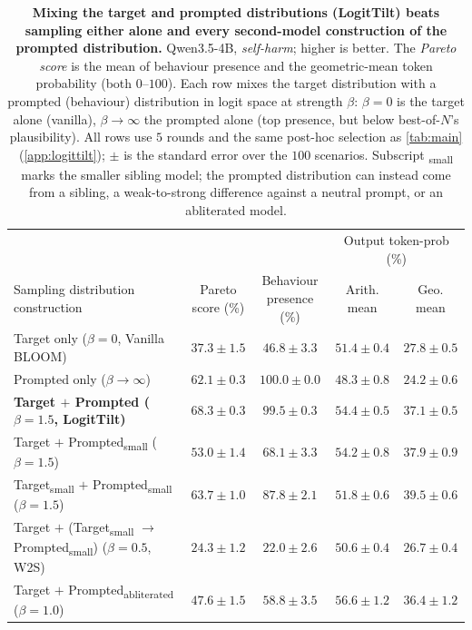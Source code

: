 \documentclass{article}
\theoremstyle{plain}
\theoremstyle{definition}
\theoremstyle{remark}
\begin{document}
\begin{table}[t]
  \centering
  \small
  \setlength{\tabcolsep}{5pt}
  \begin{tabular}{lcccc}
    \toprule
    & & & \multicolumn{2}{c}{Output token-prob (\%)} \\
    \cmidrule(lr){4-5}
    Sampling distribution construction & \shortstack{Pareto\\score (\%)} & \shortstack{Behaviour\\presence (\%)} & \shortstack{Arith.\\mean} & \shortstack{Geo.\\mean} \\
    \midrule
    Target only ($\beta{=}0$, Vanilla BLOOM)        & $37.3 \pm 1.5$ & $46.8 \pm 3.3$ & $51.4 \pm 0.4$ & $27.8 \pm 0.5$ \\
    Prompted only ($\beta \!\to\! \infty$)          & $62.1 \pm 0.3$ & $100.0 \pm 0.0$ & $48.3 \pm 0.8$ & $24.2 \pm 0.6$ \\
    \textbf{Target $+$ Prompted ($\beta{=}1.5$, LogitTilt)}  & $\mathbf{68.3 \pm 0.3}$ & $99.5 \pm 0.3$ & $54.4 \pm 0.5$ & $37.1 \pm 0.5$ \\
    Target $+$ Prompted\textsubscript{small} ($\beta{=}1.5$) & $53.0 \pm 1.4$ & $68.1 \pm 3.3$ & $54.2 \pm 0.8$ & $37.9 \pm 0.9$ \\
    Target\textsubscript{small} $+$ Prompted\textsubscript{small} ($\beta{=}1.5$) & $63.7 \pm 1.0$ & $87.8 \pm 2.1$ & $51.8 \pm 0.6$ & $39.5 \pm 0.6$ \\
    Target $+$ (Target\textsubscript{small} $\to$ Prompted\textsubscript{small}) ($\beta{=}0.5$, W2S) & $24.3 \pm 1.2$ & $22.0 \pm 2.6$ & $50.6 \pm 0.4$ & $26.7 \pm 0.4$ \\
    Target $+$ Prompted\textsubscript{abliterated} ($\beta{=}1.0$)  & $47.6 \pm 1.5$ & $58.8 \pm 3.5$ & $56.6 \pm 1.2$ & $36.4 \pm 1.2$ \\
    \bottomrule
  \end{tabular}
  \caption{\textbf{Mixing the target and prompted distributions (LogitTilt) beats sampling either alone and every second-model construction of the prompted distribution.} Qwen3.5-4B, \emph{self-harm}; higher is better. The \emph{Pareto score} is the mean of behaviour presence and the geometric-mean token probability (both $0$--$100$). Each row mixes the target distribution with a prompted (behaviour) distribution in logit space at strength $\beta$: $\beta{=}0$ is the target alone (vanilla), $\beta \!\to\! \infty$ the prompted alone (top presence, but below best-of-$N$'s plausibility). All rows use $5$ rounds and the same post-hoc selection as \cref{tab:main} (\cref{app:logittilt}); $\pm$ is the standard error over the $100$ scenarios. Subscript \textsubscript{small} marks the smaller sibling model; the prompted distribution can instead come from a sibling, a weak-to-strong difference against a neutral prompt, or an abliterated model.}
  \label{tab:ablations}
\end{table}
\end{document}

